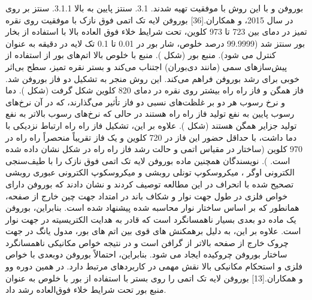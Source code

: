 بوروفن و  با این روش با موفقیت تهیه شدند. 3.1. سنتز پایین به بالا 3.1.1. سنتز بر روی  در سال 2015،  و همکاران.[36] بوروفن لایه تک اتمی فوق نازک با موفقیت روی نقره تمیز در دمای بین 723 تا 973 کلوین، تحت شرایط خلاء فوق العاده بالا با استفاده از بخار بور سنتز شد (99.9999 درصد خلوص، شار بور در 0.01 تا 0.1 تک لایه در دقیقه به عنوان \lr{[$ML min^{-1}]$} کنترل می شود). منبع بور (شکل ). منبع با خلوص بالا اتم‌های بور از استفاده از پیش‌سازهای سمی (مانند دی‌بوران) اجتناب می‌کند و بستر نقره تمیز، سطح بی‌اثر خوبی برای رشد بوروفن فراهم می‌کند. این روش منجر به تشکیل دو فاز بوروفن شد. فاز همگن و فاز راه راه بیشتر روی نقره در دمای 820 کلوین شکل گرفت (شکل ). دما و نرخ رسوب هر دو بر غلظت‌های نسبی دو فاز تأثیر می‌گذارند، که در آن نرخ‌های رسوب پایین به نفع تولید فاز راه راه هستند در حالی که نرخ‌های رسوب بالاتر به نفع تولید جزایر همگن هستند (شکل ). علاوه بر این، تشکیل فاز راه راه ارتباط نزدیکی با دما داشت، با حداقل حضور این فاز در 720 کلوین و یک فاز تقریباً منحصراً راه راه در 970 کلوین (ساختار در مقیاس اتمی و حالت رشد فاز راه راه در شکل  نشان داده شده است. ). نویسندگان همچنین ماده بوروفن لایه تک اتمی فوق نازک را با طیف‌سنجی الکترونی اوگر ، میکروسکوپ تونلی روبشی  و میکروسکوپ الکترونی عبوری روبشی تصحیح شده با انحراف  در این مطالعه توصیف کردند و نشان دادند که بوروفن دارای خواص فلزی در طول جهت نوار و شکاف باند در امتداد جهت چین خارج از صفحه، همانطور که بر اساس ساختار نوار محاسبه شده پیشنهاد شده است. بنابراین، بوروفن یک ماده دو بعدی بسیار ناهمسانگرد است که قادر به هدایت الکتریسیته در جهت نوار است. علاوه بر این، به دلیل برهمکنش های قوی بین اتم های بور، مدول یانگ در جهت چروک خارج از صفحه بالاتر از گرافن است و در نتیجه خواص مکانیکی ناهمسانگرد ساختار بوروفن چروکیده ایجاد می شود. بنابراین، احتمالاً بوروفن دوبعدی با خواص فلزی و استحکام مکانیکی بالا نقش مهمی در کاربردهای مرتبط دارد. در همین دوره وو و همکاران.[13] بوروفن لایه تک اتمی را روی بستر  با استفاده از بور با خلوص  به عنوان منبع بور تحت شرایط خلاء فوق‌العاده رشد داد.

